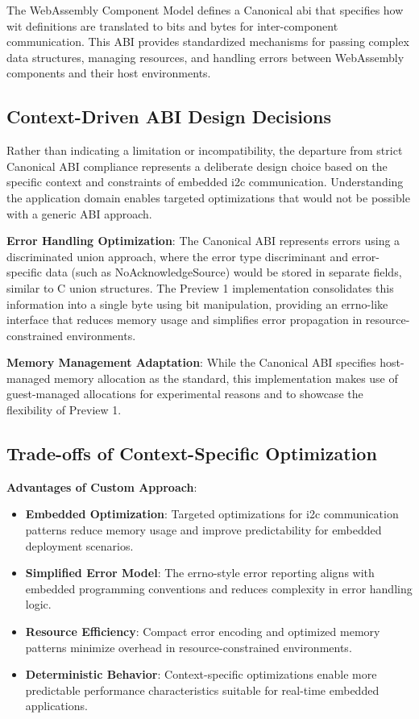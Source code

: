 The WebAssembly Component Model defines a Canonical \acrfull{abi} that specifies how \acrshort{wit} definitions are translated to bits and bytes for inter-component communication. This ABI provides standardized mechanisms for passing complex data structures, managing resources, and handling errors between WebAssembly components and their host environments.

\subsection{Context-Driven ABI Design Decisions}

Rather than indicating a limitation or incompatibility, the departure from strict Canonical ABI compliance represents a deliberate design choice based on the specific context and constraints of embedded \acrshort{i2c} communication. Understanding the application domain enables targeted optimizations that would not be possible with a generic ABI approach.

\textbf{Error Handling Optimization}: The Canonical ABI represents errors using a discriminated union approach, where the error type discriminant and error-specific data (such as NoAcknowledgeSource) would be stored in separate fields, similar to C union structures. The Preview 1 implementation consolidates this information into a single byte using bit manipulation, providing an errno-like interface that reduces memory usage and simplifies error propagation in resource-constrained environments.

\textbf{Memory Management Adaptation}: While the Canonical ABI specifies host-managed memory allocation as the standard, this implementation makes use of guest-managed allocations for experimental reasons and to showcase the flexibility of Preview 1.

\subsection{Trade-offs of Context-Specific Optimization}

\textbf{Advantages of Custom Approach}:
\begin{itemize}
    \item \textbf{Embedded Optimization}: Targeted optimizations for \acrshort{i2c} communication patterns reduce memory usage and improve predictability for embedded deployment scenarios.
    \item \textbf{Simplified Error Model}: The errno-style error reporting aligns with embedded programming conventions and reduces complexity in error handling logic.
    \item \textbf{Resource Efficiency}: Compact error encoding and optimized memory patterns minimize overhead in resource-constrained environments.
    \item \textbf{Deterministic Behavior}: Context-specific optimizations enable more predictable performance characteristics suitable for real-time embedded applications.
\end{itemize}

